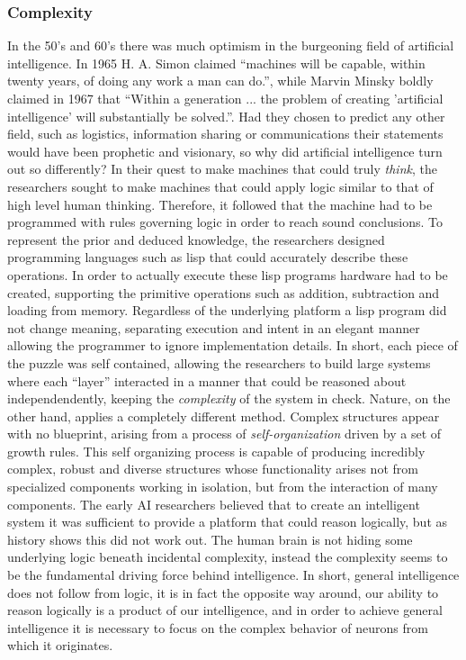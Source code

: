 \subsubsection{Complexity}
In the 50's and 60's there was much optimism in the burgeoning field of
artificial intelligence. In 1965 H. A. Simon claimed ``machines will be capable,
within twenty years, of doing any work a man can
do.'', while Marvin Minsky boldly claimed in 1967
that ``Within a generation ... the problem of creating 'artificial intelligence'
will substantially be solved.''.
Had they chosen to predict any other field, such as logistics, information
sharing or communications their statements would have been prophetic and
visionary, so why did artificial intelligence turn out so differently?
%
In their quest to make machines that could truly \emph{think}, the researchers
sought to make machines that could apply logic similar to that of high level
human thinking. 
%
Therefore, it followed that the machine had to be programmed with rules
governing logic in order to reach sound conclusions.
%
To represent the prior and deduced knowledge, the researchers designed
programming languages such as lisp that could accurately describe these
operations.
%
In order to actually execute these lisp programs hardware had to be created,
supporting the primitive operations such as addition, subtraction and loading
from memory.
%
Regardless of the underlying platform a lisp program did not change meaning,
separating execution and intent in an elegant manner allowing the programmer to
ignore implementation details.
%
In short, each piece of the puzzle was self contained, allowing the researchers 
to build large systems where each ``layer'' interacted in a manner that could be
reasoned about independendently, keeping the \emph{complexity} of the system in
check.
%
Nature, on the other hand, applies a completely different method.
Complex structures appear with no blueprint, arising from a process of
\emph{self-organization} driven by a set of growth rules.
%
This self organizing process is capable of producing incredibly complex, robust
and diverse structures whose functionality arises not from specialized
components working in isolation, but from the interaction of many components.
%
The early AI researchers believed that to create an intelligent system it was
sufficient to provide a platform that could reason logically, but as history
shows this did not work out.
%
The human brain is not hiding some underlying logic beneath incidental
complexity, instead the complexity seems to be the fundamental driving force
behind intelligence.
%
In short, general intelligence does not follow from logic, it is in fact the
opposite way around, our ability to reason logically is a product of our
intelligence, and in order to achieve general intelligence it is necessary to
focus on the complex behavior of neurons from which it originates.
